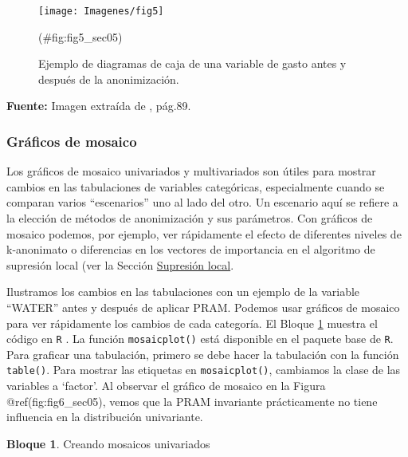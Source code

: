 \documentclass[
]{book}
\theoremstyle{definition}
\theoremstyle{definition}
\newtheorem{example}{Bloque}[chapter]
\theoremstyle{definition}
\theoremstyle{definition}
\theoremstyle{remark}
\begin{document}
\begin{figure}

{\centering \texttt{[image: Imagenes/fig5]} 

}

\caption{Ejemplo de diagramas de caja de una variable de gasto antes y después de la anonimización.}(\#fig:fig5_sec05)
\end{figure}

\textbf{Fuente:} Imagen extraída de \citep{benschop2021}, pág.89.

\hypertarget{gruxe1ficos-de-mosaico}{%
\subsubsection{Gráficos de mosaico}\label{gruxe1ficos-de-mosaico}}

Los gráficos de mosaico univariados y multivariados son útiles para mostrar cambios en las tabulaciones de variables categóricas, especialmente cuando se comparan varios ``escenarios'' uno al lado del otro. Un escenario aquí se refiere a la elección de métodos de anonimización y sus parámetros. Con gráficos de mosaico podemos, por
ejemplo, ver rápidamente el efecto de diferentes niveles de k-anonimato o diferencias en los vectores de importancia en el algoritmo de supresión local (ver la Sección \protect\hyperlink{sup-loc}{Supresión local}.

Ilustramos los cambios en las tabulaciones con un ejemplo de la variable ``WATER'' antes y después de aplicar PRAM. Podemos usar gráficos de mosaico para ver rápidamente los cambios de cada categoría. El Bloque \ref{exm:bloque13lbn} muestra el código en \texttt{R} . La función \texttt{mosaicplot()} está disponible en el paquete base de \texttt{R}. Para graficar una tabulación, primero se debe hacer la tabulación con la función \texttt{table()}. Para mostrar las etiquetas en \texttt{mosaicplot()}, cambiamos la clase de las variables a `factor'. Al observar el gráfico de mosaico en la Figura @ref(fig:fig6\_sec05), vemos que la PRAM invariante prácticamente no tiene influencia en la distribución univariante.

\begin{example}
\protect\hypertarget{exm:bloque13lbn}{}\label{exm:bloque13lbn}Creando mosaicos univariados
\end{example}
\end{document}
